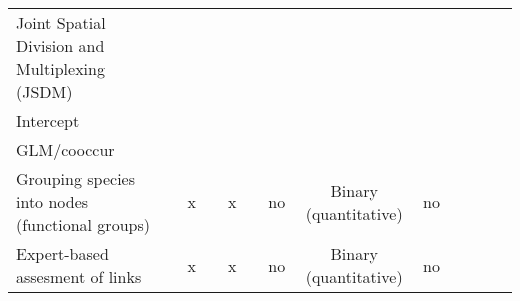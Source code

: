 \begin{sidewaystable}
\begin{tabular}{llccccccccccc}
Joint Spatial Division and Multiplexing (JSDM)  &                               &                                         &                                  &                           &                               &                                   &                                   &                                &                            &                                        &                                                                                                                                          \\
Intercept                                       &                               &                                         &                                  &                           &                               &                                   &                                   &                                &                            &                                        &                                                                                                                                          \\
GLM/cooccur                                     &                               &                                         &                                  &                           &                               &                                   &                                   &                                &                            &                                        &                                                                                                                                          \\
Grouping species into nodes (functional groups) &                               & x                                       &                                  & x                         &                               & no                                & Binary (quantitative)             & no                             &                            &                                        &                                                                                                                                          \\
Expert-based assesment of links                 &                               & x                                       &                                  & x                         &                               & no                                & Binary (quantitative)             & no                             &                            &                                        &
\end{tabular}
\end{sidewaystable}
